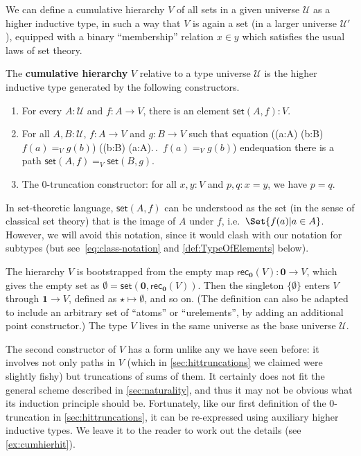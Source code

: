 \documentclass[10pt,a4paper]{article}
\makeatletter
\providecommand{\index}[1]{}
\newcommand{\define}[1]{\textbf{#1}}
\def\fall#1{\forall (#1)\@ifnextchar\bgroup{.\,\fall}{.\,}}
\def\exis#1{\exists (#1)\@ifnextchar\bgroup{.\,\exis}{.\,}}
\let\setof\Set    %
\newcommand{\rec}[1]{\mathsf{rec}_{#1}}
\newcommand{\id}[3][]{\ensuremath{#2 =_{#1} #3}\xspace}
\newcommand{\UU}{\ensuremath{\mathcal{U}}\xspace}
\newcommand{\emptyt}{\ensuremath{\mathbf{0}}\xspace}
\newcommand{\unit}{\ensuremath{\mathbf{1}}\xspace}
\newcommand{\ttt}{\ensuremath{\star}\xspace}
\newcommand{\vset}{\mathsf{set}}  %
\theoremstyle{definition}
\theoremstyle{remark}
\numberwithin{equation}{section}
\newcommand{\indexdef}[1]{\index{#1|defstyle}}   %
\newcommand{\narrowbreak}{}
\newenvironment{narrowmultline}{\csname equation\endcsname}{\csname endequation\endcsname}
\makeatother
\begin{document}
\index{bargaining|(}%
We can define a cumulative hierarchy $V$ of all sets in a given universe $\UU$ as a higher inductive type, in such a way that $V$ is again a set (in a larger universe $\UU'$), equipped with a binary ``membership'' relation $x\in y$ which satisfies the usual laws of set theory.

\begin{defn}\label{defn:V}
  The \define{cumulative hierarchy}
  \indexdef{cumulative!hierarchy, set-theoretic}%
  \indexdef{hierarchy!cumulative, set-theoretic}%
  $V$ relative to a type universe $\UU$ is the
  higher inductive type generated by the following constructors.
  \begin{enumerate}
  \item For every $A : \UU$ and $f : A \to V$, there is an element $\vset(A, f) : V$.
  \item For all $A, B : \UU$, $f : A \to V$ and $g : B \to V$ such that
    \begin{narrowmultline} \label{eq:V-path}
      \big(\fall{a:A} \exis{b:B} \id[V]{f(a)}{g(b)}\big) \land \narrowbreak
      \big(\fall{b:B} \exis{a:A} \id[V]{f(a)}{g(b)}\big)
    \end{narrowmultline}
    there is a path $\id[V]{\vset(A,f)}{\vset(B,g)}$.
  \item The 0-truncation constructor: for all $x,y:V$ and $p,q:x=y$, we have $p=q$.
  \end{enumerate}
\end{defn}

In set-theoretic language, $\vset(A,f)$ can be understood as the set (in the sense of classical set theory) that is the image of $A$ under $f$, i.e.\ $\setof{ f(a) | a \in A }$.
However, we will avoid this notation, since it would clash with our notation for subtypes (but see~\eqref{eq:class-notation} and \cref{def:TypeOfElements} below).

The hierarchy $V$ is
bootstrapped from the empty map $\rec\emptyt(V) : \emptyt \to V$, which gives the empty set as $\emptyset = \vset(\emptyt,\rec\emptyt(V))$.
Then the singleton $\{\emptyset\}$ enters $V$ through $\unit \to V$, defined as $\ttt \mapsto \emptyset$, and so
on.
(The definition can also be adapted to include an arbitrary set of ``atoms'' or ``urelements'', by adding an additional point constructor.)
The type $V$ lives in the same universe as the base universe $\UU$.

The second constructor of $V$ has a form unlike any we have seen before: it involves not only paths in $V$ (which in \cref{sec:hittruncations} we claimed were slightly fishy) but truncations of sums of them.
It certainly does not fit the general scheme described in \cref{sec:naturality}, and thus it may not be obvious what its induction principle should be.
Fortunately, like our first definition of the 0-truncation in \cref{sec:hittruncations}, it can be re-expressed using auxiliary higher inductive types.
We leave it to the reader to work out the details (see \cref{ex:cumhierhit}).
\end{document}
